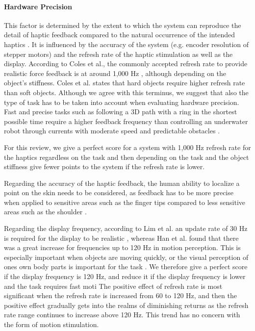 \paragraph{Hardware Precision}
This factor is determined by the extent to which the system can reproduce the detail of haptic feedback compared to the natural occurrence of the intended haptics \cite{Muender2022HapticReality}. 
It is influenced by the accuracy of the system (e.g. encoder resolution of stepper motors) and the refresh rate of the haptic stimulation as well as the display. According to Coles et al., the commonly accepted refresh rate to provide realistic force feedback is at around 1,000 Hz \cite{Coles2011TheArt}, although depending on the object's stiffness. Coles et al. states that hard objects require higher refresh rate than soft objects. Although we agree with this terminus, we suggest that also the type of task has to be taken into account when evaluating hardware precision. Fast and precise tasks such as following a 3D path with a ring in the shortest possible time \cite{Oquendo2024} require a higher feedback frequency than controlling an underwater robot through currents with moderate speed and predictable obstacles \cite{Xia2023}.

For this review, we give a perfect score for a system with 1,000 Hz refresh rate for the haptics regardless on the task and then depending on the task and the object stiffness give fewer points to the system if the refresh rate is lower.

Regarding the accuracy of the haptic feedback, the human ability to localize a point on the skin needs to be considered, as feedback has to be more precise when applied to sensitive areas such as the finger tips compared to less sensitive areas such as the shoulder \cite{Lederman2009HapticTutorial}.

Regarding the display frequency, according to Lim et al. an update rate of 30 Hz is required for the display to be realistic \cite{Lim2021}, whereas Han et al. found that there was a great increase for frequencies up to 120 Hz in motion perception. This is especially important when objects are moving quickly, or the visual perception of ones own body parts is important for the task \cite{Han2022AssessingPotentials}.
We therefore give a perfect score if the display frequency is 120 Hz, and reduce it if the display frequency is lower and the task requires fast moti
The positive effect of refresh rate is most significant when the refresh rate is increased from 60 to 120 Hz, and then the positive effect gradually gets into the realms of diminishing returns as the refresh rate range continues to increase above 120 Hz. This trend has no concern with the form of motion stimulation.

